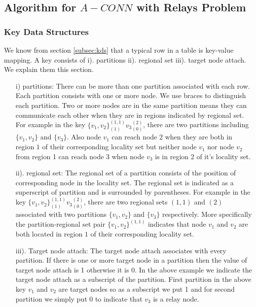 \documentclass[12pt]{article}
\begin{document}
\subsection{Algorithm for  $A-CONN$ with Relays Problem}
\subsubsection{Key Data Structures}
We know from section \ref{subsec:kds} that a typical row in a table is key-value mapping. A key consists of 
i). partitions ii). regional set iii). target node attach. We explain them this section.


\begin{itemize}
\item[i)] partitions: There can be more than one partition associated with each row. Each partition consists with one or more node. We use braces to distinguish each partition. Two or more nodes are in the same partition means they can communicate each other when they are in regions indicated by regional set. For example in the key $\{v_1,v_2\}^{(1,1)}_{(1)}{v_3}^{(2)}_{(0)}$, there are two partitions including $\{v_1,v_2\}$ and $\{v_3\}$. Also node $v_1$ can reach node $2$ when they are both in region $1$ of their corresponding locality set but neither node $v_1$ nor node $v_2$  from region 1 can reach node 3 when node $v_3$ is in region 2 of it's locality set.
\item[ii).] regional set: The regional set of a partition consists of the position of corresponding node in the locality set. The regional set is indicated as a superscript of partition and is surrounded by parentheses. For example in the key $\{v_1,v_2\}^{(1,1)}_{(1)}{v_3}^{(2)}_{(0)}$, there are two regional sets $(1,1)$ and $(2)$ associated with two partitions $\{v_1,v_2\}$ and $\{v_3\}$ respectively. More specifically the partition-regional set pair $\{v_1,v_2\}^{(1,1)}$ indicates that node $v_1$ and $v_2$ are both located in region $1$ of their corresponding locality set.
\item[iii).] Target node attach: The target node attach associates with every partition. If there is one or more target node in a partition then the value of target node attach is 1 otherwise it is 0. In the above example we indicate the target node attach as a subscript of the partition. First partition in the above key $v_1$ and $v_2$ are target nodes so as a subscript we put 1 and for second partition we simply put 0 to indicate that $v_3$ is a relay node.
\end{itemize}
\end{document}

